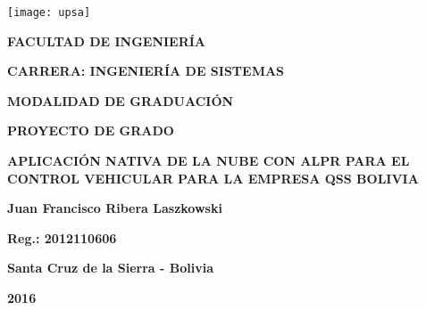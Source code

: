 {
\begin{titlepage}
     
    
    \begin{center}
        \texttt{[image: upsa]}
        
        \vspace{0.5cm}
            \large \textbf{FACULTAD DE INGENIERÍA}
            
            \textbf{CARRERA: INGENIERÍA DE SISTEMAS}
        
        \vspace{1cm}
            \textbf{MODALIDAD DE GRADUACIÓN}
            
            \textbf{PROYECTO DE GRADO}
        
        \vspace{2cm}
            \textbf{APLICACIÓN NATIVA DE LA NUBE CON ALPR PARA EL CONTROL VEHICULAR PARA LA EMPRESA QSS BOLIVIA}
        
        \vspace{3cm}
            \textbf{Juan Francisco Ribera Laszkowski}
            
            \textbf{Reg.: 2012110606}
        
        \vfill
            \textbf{Santa Cruz de la Sierra - Bolivia}
            
            \textbf{2016}
    \end{center}
\end{titlepage}
\renewcommand{\baselinestretch}{1.6} 

\restoregeometry
}